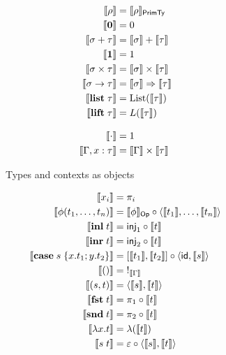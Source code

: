 \begin{figure}
\begin{subfigure}[t]{0.47\linewidth}
    \small
    \begin{align*}
    \llbracket \rho \rrbracket &= \llbracket \rho \rrbracket_{\mathsf{PrimTy}}
    \\
    \llbracket \mathbf{0} \rrbracket &= 0
    \\
    \llbracket \sigma + \tau \rrbracket &= \textstyle {\llbracket \sigma \rrbracket} + {\llbracket \tau \rrbracket}
    \\
    \llbracket \mathbf{1} \rrbracket &= 1
    \\
    \llbracket \sigma \times \tau \rrbracket &= \llbracket \sigma \rrbracket \times \llbracket \tau \rrbracket
    \\
    \llbracket \sigma \to \tau \rrbracket &= \llbracket \sigma \rrbracket \Rightarrow \llbracket \tau \rrbracket
    \\
    \llbracket \mathbf{list}\;\tau \rrbracket &= \mathrm{List}(\llbracket \tau \rrbracket)
    \\
    \llbracket \mathbf{lift}\;\tau \rrbracket &= L(\llbracket \tau \rrbracket)
    \\[3mm]
    \llbracket \cdot \rrbracket &= 1
    \\
    \llbracket \Gamma, x: \tau \rrbracket &= \llbracket \Gamma \rrbracket \times \llbracket \tau \rrbracket
    \end{align*}
  \caption{Types and contexts as objects}
  \label{fig:semantics:types}
\end{subfigure}
\begin{subfigure}{0.8\linewidth}
  \small
  \begin{align*}
  \sem{x_i} &= \pi_i
  \\
  \sem{\phi(t_1, \ldots, t_n)}
  &=
  \sem{\phi}_{\Op} \comp \prodM{\sem{t_1}}{\ldots, \sem{t_n}}
  \\
  \sem{\tmInl{t}} &= \mathsf{inj}_1 \comp \sem{t}
  \\
  \sem{\tmInr{t}} &= \mathsf{inj}_2 \comp \sem{t}
  \\
  \sem{\tmCase{s}{x}{t_1}{y}{t_2}} &= \coprodM{\sem{t_1}}{\sem{t_2}} \comp \prodM{\id}{\sem{s}}
  \\
  \sem{\tmUnit} &=\;!_{\sem{\Gamma}}
  \\
  \sem{\tmPair{s}{t}} &= \prodM{\sem{s}}{\sem{t}}
  \\
  \sem{\tmFst{t}} &= \pi_1 \comp \sem{t}
  \\
  \sem{\tmSnd{t}} &= \pi_2 \comp \sem{t}
  \\
  \sem{\tmFun{x}{t}} &= \lambda(\sem{t})
  \\
  \sem{\tmApp{s}{t}} &= \eval \comp \prodM{\sem{s}}{\sem{t}}

\end{align*}
\end{subfigure}
\end{figure}

